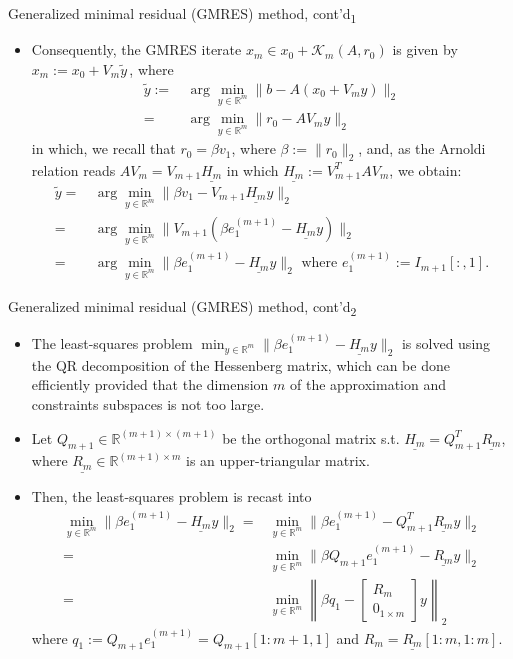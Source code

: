 \documentclass[t,usepdftitle=false]{beamer}
\begin{document}
\begin{frame}{Generalized minimal residual (GMRES) method, cont'd\textsubscript{1}}
\begin{itemize}
\item Consequently, the GMRES iterate $x_m\in x_0+\mathcal{K}_m(A,r_0)$ is given by $\boxed{x_m:=x_0+V_m\tilde{y}}\,$, where
\begin{align*}
\tilde{y}
:=&\,\arg\min_{y\in\mathbb{R}^{m}}\|b-A(x_0+V_my)\|_2\\
=&\,\arg\min_{y\in\mathbb{R}^m}\|r_0-AV_my\|_2
\end{align*}
in which, we recall that $r_0=\beta v_1$, where $\beta:=\|r_0\|_2$, and, as the Arnoldi relation reads $AV_m=V_{m+1}\underline{H_m}$ in which $\underline{H_m}:=V_{m+1}^TAV_m$, we obtain:
\begin{align*}
\tilde{y}
=&\,\arg\min_{y\in\mathbb{R}^m}\|\beta v_1-V_{m+1}\underline{H_{m}}y\|_2\\
=&\,\arg\min_{y\in\mathbb{R}^m}\|V_{m+1}(\beta e_1^{(m+1)}-\underline{H_{m}}y)\|_2\\
=&\,\arg\min_{y\in\mathbb{R}^m}\|\beta e_1^{(m+1)}-\underline{H_{m}}y\|_2
\text{ where }e_1^{(m+1)}:=I_{m+1}[:,1].
\end{align*}
\end{itemize}
\end{frame}

\begin{frame}{Generalized minimal residual (GMRES) method, cont'd\textsubscript{2}}
\begin{itemize}
\item The least-squares problem $\min_{y\in\mathbb{R}^m}\|\beta e_1^{(m+1)}-\underline{H_m}y\|_2$ is solved using the QR decomposition of the Hessenberg matrix, which can be done efficiently provided that the dimension $m$ of the approximation and constraints subspaces is not too large.
\item[] Let $Q_{m+1}\in\mathbb{R}^{(m+1)\times(m+1)}$ be the orthogonal matrix s.t. $\underline{H_m}=Q_{m+1}^T\underline{R_{m}}$, where $\underline{R_{m}}\in\mathbb{R}^{(m+1)\times m}$ is an upper-triangular matrix.
\item[] Then, the least-squares problem is recast into
\begin{align*}
\min_{y\in\mathbb{R}^m}\|\beta e_1^{(m+1)}-\underline{H_{m}}y\|_2
=&\min_{y\in\mathbb{R}^m}\|\beta e_1^{(m+1)}-Q_{m+1}^T\underline{R_m}y\|_2\\
=&\min_{y\in\mathbb{R}^m}\|\beta Q_{m+1}e_1^{(m+1)}-\underline{R_m}y\|_2\\
=&\min_{y\in\mathbb{R}^m}\left\|\beta q_1-\begin{bmatrix}R_m\\0_{1\times m}\end{bmatrix}y\right\|_2
\end{align*}
where $q_1:=Q_{m+1}e_1^{(m+1)}=Q_{m+1}[1:m+1,1]$ and $R_m=\underline{R_{m}}[1\!:\!m,1\!:\!m]$.
\end{itemize}
\end{frame}
\end{document}
